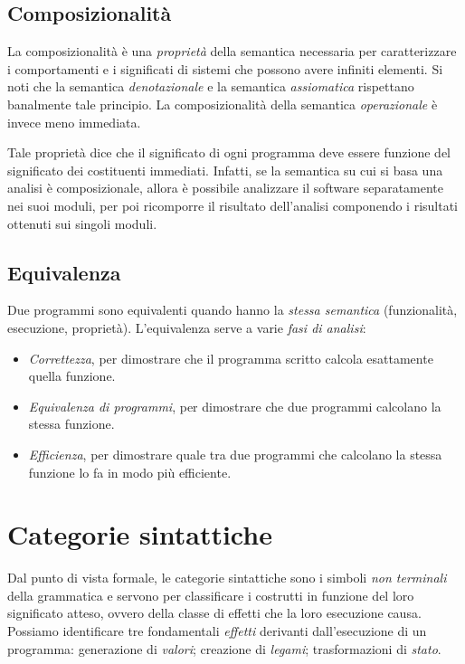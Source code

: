 \documentclass[a4paper,oneside,titlepage]{book}
\begin{document}
\subsection{Composizionalità}
La composizionalità è una \textit{proprietà} della semantica necessaria per caratterizzare i comportamenti e i significati di sistemi che possono avere infiniti elementi. Si noti che la semantica \textit{denotazionale} e la semantica \textit{assiomatica} rispettano banalmente tale principio. La composizionalità della semantica \textit{operazionale} è invece meno immediata.

Tale proprietà dice che il significato di ogni programma deve essere funzione del significato dei costituenti immediati. Infatti, se la semantica su cui si basa una analisi è composizionale, allora è possibile analizzare il software separatamente nei suoi moduli, per poi ricomporre il risultato dell'analisi componendo i risultati ottenuti sui singoli moduli.

\subsection{Equivalenza}
Due programmi sono equivalenti quando hanno la \textit{stessa semantica} (funzionalità, esecuzione, proprietà). L'equivalenza serve a varie \textit{fasi di analisi}:
\begin{itemize}
	\item \textit{Correttezza}, per dimostrare che il programma scritto calcola esattamente quella funzione.
	\item \textit{Equivalenza di programmi}, per dimostrare che due programmi calcolano la stessa funzione.
	\item \textit{Efficienza}, per dimostrare quale tra due programmi che calcolano la stessa funzione lo fa in modo più efficiente.
\end{itemize}

\section{Categorie sintattiche}
Dal punto di vista formale, le categorie sintattiche sono i simboli \textit{non terminali} della grammatica e servono per classificare i costrutti in funzione del loro significato atteso, ovvero della classe di effetti che la loro esecuzione causa.
\\
Possiamo identificare tre fondamentali \textit{effetti} derivanti dall'esecuzione di un programma: generazione di \textit{valori}; creazione di \textit{legami}; trasformazioni di \textit{stato}.
\end{document}
